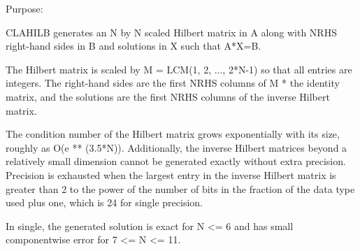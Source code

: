 \begin{DoxyParagraph}{Purpose\+: }
\begin{DoxyVerb} CLAHILB generates an N by N scaled Hilbert matrix in A along with
 NRHS right-hand sides in B and solutions in X such that A*X=B.

 The Hilbert matrix is scaled by M = LCM(1, 2, ..., 2*N-1) so that all
 entries are integers.  The right-hand sides are the first NRHS
 columns of M * the identity matrix, and the solutions are the
 first NRHS columns of the inverse Hilbert matrix.

 The condition number of the Hilbert matrix grows exponentially with
 its size, roughly as O(e ** (3.5*N)).  Additionally, the inverse
 Hilbert matrices beyond a relatively small dimension cannot be
 generated exactly without extra precision.  Precision is exhausted
 when the largest entry in the inverse Hilbert matrix is greater than
 2 to the power of the number of bits in the fraction of the data type
 used plus one, which is 24 for single precision.

 In single, the generated solution is exact for N <= 6 and has
 small componentwise error for 7 <= N <= 11.\end{DoxyVerb}
 
\end{DoxyParagraph}

